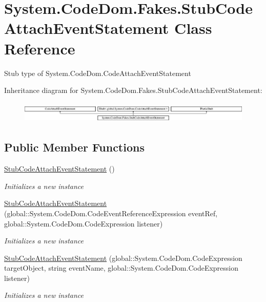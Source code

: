 \hypertarget{class_system_1_1_code_dom_1_1_fakes_1_1_stub_code_attach_event_statement}{\section{System.\-Code\-Dom.\-Fakes.\-Stub\-Code\-Attach\-Event\-Statement Class Reference}
\label{class_system_1_1_code_dom_1_1_fakes_1_1_stub_code_attach_event_statement}
}


Stub type of System.\-Code\-Dom.\-Code\-Attach\-Event\-Statement 


Inheritance diagram for System.\-Code\-Dom.\-Fakes.\-Stub\-Code\-Attach\-Event\-Statement\-:\begin{figure}[H]
\begin{center}
\leavevmode
\includegraphics[height=1.022831cm]{class_system_1_1_code_dom_1_1_fakes_1_1_stub_code_attach_event_statement}
\end{center}
\end{figure}
\subsection*{Public Member Functions}
\begin{DoxyCompactItemize}
\item 
\hyperlink{class_system_1_1_code_dom_1_1_fakes_1_1_stub_code_attach_event_statement_a7b80409045bf6d3e0a38f343bc86ce36}{Stub\-Code\-Attach\-Event\-Statement} ()
\begin{DoxyCompactList}\small\item\em Initializes a new instance\end{DoxyCompactList}\item 
\hyperlink{class_system_1_1_code_dom_1_1_fakes_1_1_stub_code_attach_event_statement_adea983bd6f362ae58e9046ab9611742f}{Stub\-Code\-Attach\-Event\-Statement} (global\-::\-System.\-Code\-Dom.\-Code\-Event\-Reference\-Expression event\-Ref, global\-::\-System.\-Code\-Dom.\-Code\-Expression listener)
\begin{DoxyCompactList}\small\item\em Initializes a new instance\end{DoxyCompactList}\item 
\hyperlink{class_system_1_1_code_dom_1_1_fakes_1_1_stub_code_attach_event_statement_adf40fdbb5272f8cf40fb39a7ba1b7c27}{Stub\-Code\-Attach\-Event\-Statement} (global\-::\-System.\-Code\-Dom.\-Code\-Expression target\-Object, string event\-Name, global\-::\-System.\-Code\-Dom.\-Code\-Expression listener)
\begin{DoxyCompactList}\small\item\em Initializes a new instance\end{DoxyCompactList}\end{DoxyCompactItemize}
